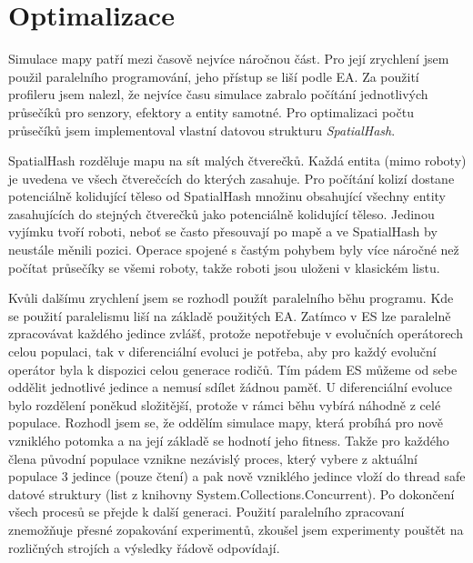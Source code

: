 \section*{Optimalizace}
Simulace mapy patří mezi časově nejvíce náročnou část. Pro její zrychlení jsem použil paralelního programování, jeho přístup se liší podle EA. Za použití profileru jsem nalezl, že nejvíce času simulace zabralo počítání jednotlivých průsečíků pro senzory, efektory a entity samotné. Pro optimalizaci počtu průsečíků jsem implementoval vlastní datovou strukturu \textit{SpatialHash}. 
\par 
SpatialHash rozděluje mapu na sít malých čtverečků. Každá entita (mimo roboty) je uvedena ve všech čtverečcích do kterých zasahuje. Pro počítání kolizí dostane potenciálně kolidující těleso od SpatialHash množinu obsahující všechny entity zasahujících do stejných čtverečků jako potenciálně kolidující těleso. Jedinou vyjímku tvoří roboti, neboť se často přesouvají po mapě a ve SpatialHash by neustále měnili pozici. Operace spojené s častým pohybem byly více náročné než počítat průsečíky se všemi roboty, takže roboti jsou uloženi v klasickém listu.
\par
Kvůli dalšímu zrychlení jsem se rozhodl použít paralelního běhu programu. Kde se použití paralelismu liší na základě použitých EA. Zatímco v ES lze paralelně zpracovávat každého jedince zvlášť, protože nepotřebuje v evolučních operátorech celou populaci, tak v diferenciální evoluci je potřeba, aby pro každý evoluční operátor byla k dispozici celou generace rodičů. Tím pádem ES můžeme od sebe oddělit jednotlivé jedince a nemusí sdílet žádnou paměť. U diferenciální evoluce bylo rozdělení poněkud složitější, protože v rámci běhu vybírá náhodně z celé populace. Rozhodl jsem se, že oddělím simulace mapy, která probíhá pro nově vzniklého potomka a na její základě se hodnotí jeho fitness. Takže pro každého člena původní populace vznikne nezávislý proces, který vybere z aktuální populace 3 jedince (pouze čtení) a pak nově vzniklého jedince vloží do thread safe datové struktury (list z knihovny System.Collections.Concurrent). Po dokončení všech procesů se přejde k další generaci. Použití paralelního zpracovaní znemožňuje přesné zopakování experimentů, zkoušel jsem experimenty pouštět na rozličných strojích a výsledky řádově odpovídají.  

